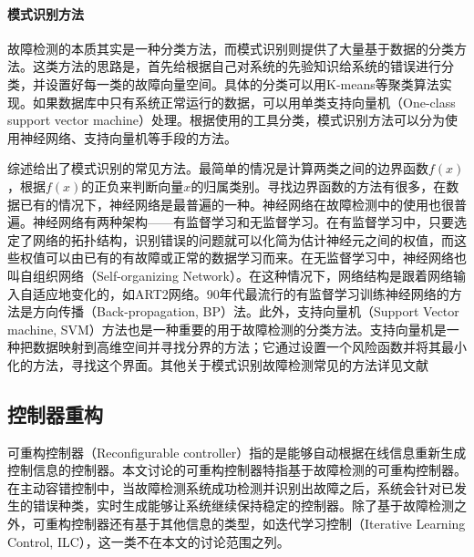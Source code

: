 \paragraph*{模式识别方法}
故障检测的本质其实是一种分类方法，而模式识别则提供了大量基于数据的分类方法。这类方法的思路是，首先给根据自己对系统的先验知识给系统的错误进行分类，并设置好每一类的故障向量空间。具体的分类可以用K-means等\cite{Patton1999}聚类算法实现。如果数据库中只有系统正常运行的数据，可以用单类支持向量机（One-class support vector machine）处理\cite{Mahadevan20091627,Chandola2009Anomaly}。根据使用的工具分类，模式识别方法可以分为使用神经网络、支持向量机等手段的方法。

综述给出了模式识别的常见方法。最简单的情况是计算两类之间的边界函数$f(x)$，根据$f(x)$的正负来判断向量$x$的归属类别。寻找边界函数的方法有很多，在数据已有的情况下，神经网络是最普遍的一种\cite{897072,Chen2002101}。神经网络在故障检测中的使用也很普遍\cite{Chen2002101,FRANK199767,Markou20032481}。神经网络有两种架构——有监督学习和无监督学习。在有监督学习中\cite{Caruana2006empirical}，只要选定了网络的拓扑结构，识别错误的问题就可以化简为估计神经元之间的权值，而这些权值可以由已有的有故障或正常的数据学习而来。在无监督学习中，神经网络也叫自组织网络（Self-organizing Network）。在这种情况下，网络结构是跟着网络输入自适应地变化的，如ART2网络\cite{33}。90年代最流行的有监督学习训练神经网络的方法是方向传播（Back-propagation, BP）法。此外，支持向量机（Support Vector machine, SVM）方法也是一种重要的用于故障检测的分类方法\cite{788640}。支持向量机是一种把数据映射到高维空间并寻找分界的方法；它通过设置一个风险函数并将其最小化的方法，寻找这个界面\cite{vapnik2013nature}。其他关于模式识别故障检测常见的方法详见文献

\subsection{控制器重构}\label{subsec:active}
可重构控制器（Reconfigurable controller）指的是能够自动根据在线信息重新生成控制信息的控制器。本文讨论的可重构控制器特指基于故障检测的可重构控制器。在主动容错控制中，当故障检测系统成功检测并识别出故障之后，系统会针对已发生的错误种类，实时生成能够让系统继续保持稳定的控制器。除了基于故障检测之外，可重构控制器还有基于其他信息的类型，如迭代学习控制\cite{1636313}（Iterative Learning Control, ILC），这一类不在本文的讨论范围之列。

